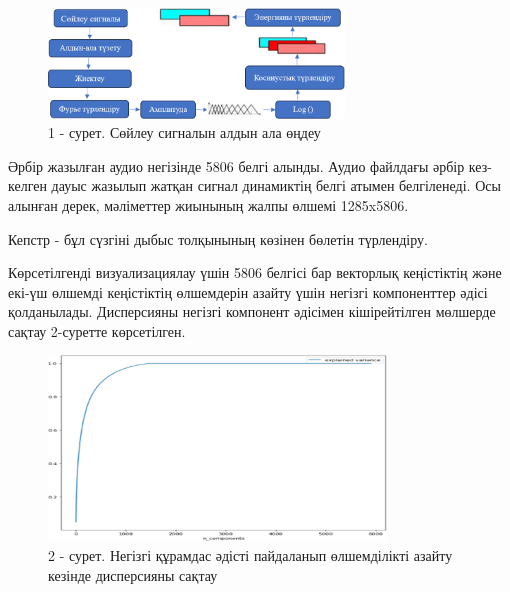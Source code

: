 \begin{figure}[H]
	\centering
	\includegraphics[width=0.7\textwidth]{media/ict/image5}
	\caption*{1 - сурет. Сөйлеу сигналын алдын ала өңдеу}
\end{figure}

\begin{multicols}{2}
Әрбір жазылған аудио негізінде 5806 белгі алынды. Аудио файлдағы әрбір
кез-келген дауыс жазылып жатқан сигнал динамиктің белгі атымен
белгіленеді. Осы алынған дерек, мәліметтер жиынының жалпы өлшемі
1285x5806.

Кепстр - бұл сүзгіні дыбыс толқынының көзінен бөлетін түрлендіру.

Көрсетілгенді визуализациялау үшін 5806 белгісі бар векторлық
кеңістіктің және екі-үш өлшемді кеңістіктің өлшемдерін азайту үшін
негізгі компоненттер әдісі қолданылады. Дисперсияны негізгі компонент
әдісімен кішірейтілген мөлшерде сақтау 2-суретте көрсетілген.
\end{multicols}

\begin{figure}[H]
	\centering
	\includegraphics[width=0.8\textwidth]{media/ict/image6}
	\caption*{2 - сурет. Негізгі құрамдас әдісті пайдаланып өлшемділікті азайту кезінде дисперсияны сақтау}
\end{figure}

